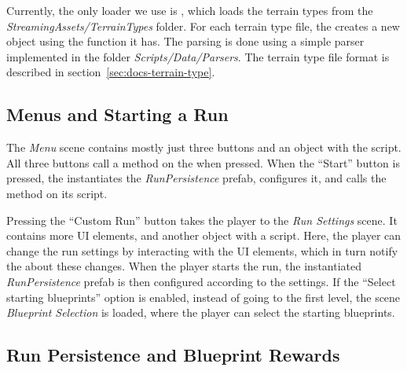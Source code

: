 Currently, the only loader we use is , which loads the terrain types from the \emph{StreamingAssets/TerrainTypes} folder.
For each terrain type file, the  creates a new  object using the function  it has.
The parsing is done using a simple parser implemented in the folder \emph{Scripts/Data/Parsers}.
The terrain type file format is described in section~\ref{sec:docs-terrain-type}.

\subsection{Menus and Starting a Run}

The \emph{Menu} scene contains mostly just three buttons and an object with the  script.
All three buttons call a method on the  when pressed.
When the \enquote{Start} button is pressed, the  instantiates the \emph{RunPersistence} prefab, configures it, and calls the  method on its  script.

Pressing the \enquote{Custom Run} button takes the player to the \emph{Run Settings} scene.
It contains more UI elements, and another object with a  script.
Here, the player can change the run settings by interacting with the UI elements, which in turn notify the  about these changes.
When the player starts the run, the instantiated \emph{RunPersistence} prefab is then configured according to the settings.
If the \enquote{Select starting blueprints} option is enabled, instead of going to the first level, the scene \emph{Blueprint Selection} is loaded, where the player can select the starting blueprints.

\subsection{Run Persistence and Blueprint Rewards}\label{sec:docs-run-persistence}

